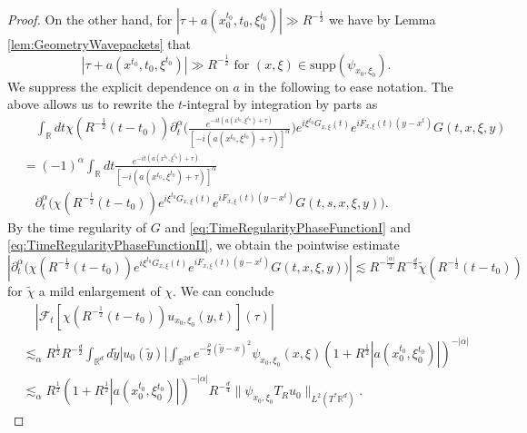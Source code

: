 \documentclass{amsart}
\theoremstyle{definition}
\newcommand{\R}{\mathbb{R}}
\begin{document}
\begin{proof}
On the other hand, for $|\tau + a(x_0^{t_0},t_0,\xi_0^{t_0})| \gg R^{-\frac{1}{2}}$  we have by Lemma \ref{lem:GeometryWavepackets} that
\begin{equation*}
| \tau + a(x^{t_0},t_0,\xi^{t_0})| \gg R^{-\frac{1}{2}} \text{ for } (x,\xi) \in \text{supp}(\psi_{x_0,\xi_0}).
\end{equation*}
We suppress the explicit dependence on $a$ in the following to ease notation.
The above allows us to rewrite the $t$-integral by integration by parts as
\begin{equation*}
\begin{split}
&\quad \int_{\R} dt \chi(R^{-\frac{1}{2}}(t-t_0)) \partial_t^{\alpha} \big( \frac{ e^{-i t (a(x^{t_0},\xi^{t_0}) + \tau)}}{[-i (a(x^{t_0},\xi^{t_0}) + \tau)]^{\alpha}} \big) e^{i \xi^{t_0} G_{x,\xi}(t)} e^{i F_{x,\xi}(t)(y-x^t)} G(t,x,\xi,y) \\
&= (-1)^{\alpha} \int_{\R} dt \frac{ e^{-i t (a(x^{t_0},\xi^{t_0}) + \tau)}}{[-i (a(x^{t_0},\xi^{t_0}) + \tau)]^{\alpha}} \\
&\quad \partial_t^{\alpha} \big( \chi(R^{-\frac{1}{2}}(t-t_0)) e^{i \xi^{t_0} G_{x,\xi}(t)} e^{i F_{x,\xi}(t)(y-x^t)} G(t,s,x,\xi,y) \big).
\end{split}
\end{equation*}
By the time regularity of $G$ and \eqref{eq:TimeRegularityPhaseFunctionI} and \eqref{eq:TimeRegularityPhaseFunctionII}, we obtain the pointwise estimate
\begin{equation*}
| \partial_t^{\alpha} \big( \chi(R^{-\frac{1}{2}}(t-t_0)) e^{i \xi^{t_0} G_{x,\xi}(t)} e^{i F_{x,\xi}(t)(y-x^t)} G(t,x,\xi,y) \big) | \lesssim R^{-\frac{|\alpha|}{2}} R^{-\frac{d}{2}} \tilde{\chi}(R^{-\frac{1}{2}}(t-t_0))
\end{equation*}
for $\tilde{\chi}$ a mild enlargement of $\chi$. We can conclude
\begin{equation*}
\begin{split}
&\quad |\mathcal{F}_t[\chi(R^{-\frac{1}{2}}(t-t_0)) u_{x_0,\xi_0}(y,t)](\tau) | \\
 &\lesssim_\alpha R^{\frac{1}{2}} R^{-\frac{d}{2}} \int_{\R^d} d\tilde{y} |u_0(\tilde{y})| \int_{\R^{2d}} e^{-\frac{\rho}{2}(\tilde{y}-x)^2} \psi_{x_0,\xi_0}(x,\xi) (1+ R^{\frac{1}{2}} |a(x^{t_0}_0,\xi^{t_0}_0)|)^{-|\alpha|} \\
&\lesssim_\alpha R^{\frac{1}{2}} (1+ R^{\frac{1}{2}} |a(x^{t_0}_0,\xi^{t_0}_0)|)^{-|\alpha|} R^{-\frac{d}{4}} \| \psi_{x_0,\xi_0} T_R u_0 \|_{L^2(T^* \R^d)}.
\end{split}
\end{equation*}
\end{proof}
\end{document}
